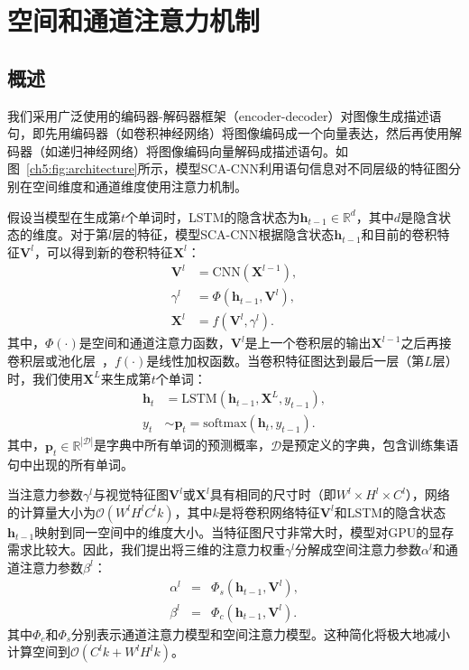 \section{空间和通道注意力机制}

\subsection{概述}
我们采用广泛使用的编码器-解码器框架（encoder-decoder）对图像生成描述语句，即先用编码器（如卷积神经网络）将图像编码成一个向量表达，然后再使用解码器（如递归神经网络）将图像编码向量解码成描述语句。如图~\ref{ch5:fig:architecture}所示，模型SCA-CNN利用语句信息对不同层级的特征图分别在空间维度和通道维度使用注意力机制。

假设当模型在生成第$t$个单词时，LSTM的隐含状态为$\bm{h}_{t-1}\in\mathbb{R}^d$，其中$d$是隐含状态的维度。对于第$l$层的特征，模型SCA-CNN根据隐含状态$\bm{h}_{t-1}$和目前的卷积特征$\bm{V}^l$，可以得到新的卷积特征$\bm{X}^l$：
\begin{equation} \label{ch5:eq:eq_1}
\begin{split}
\bm{V}^l &= \textrm{CNN}\left(\bm{X}^{l-1}\right),\\
\gamma^l &= \Phi\left(\bm{h}_{t-1},\bm{V}^l\right),\\
\bm{X}^l &= f\left(\bm{V}^{l},\gamma^{l}\right).
\end{split}
\end{equation}
其中，$\Phi(\cdot)$是空间和通道注意力函数，$\bm{V}^l$是上一个卷积层的输出$\bm{X}^{l-1}$之后再接卷积层或池化层~\cite{simonyan2015very,he2016deep}，$f(\cdot)$是线性加权函数。当卷积特征图达到最后一层（第$L$层）时，我们使用$\bm{X}^L$来生成第$t$个单词：
\begin{equation}
\begin{split}
\bm{h}_t &= \textrm{LSTM}\left(\bm{h}_{t-1},\bm{X}^L,y_{t-1}\right),\\
y_t & \sim \bm{p}_t = \textrm{softmax} \left(\bm{h}_t, y_{t-1} \right).
\end{split}
\end{equation}
其中，$\bm{p}_t \in \mathbb{R}^{|\mathcal{D}|}$是字典中所有单词的预测概率，$\mathcal{D}$是预定义的字典，包含训练集语句中出现的所有单词。

当注意力参数$\gamma^l$与视觉特征图$\bm{V}^l$或$\bm{X}^l$具有相同的尺寸时（即$W^l\times H^l\times C^l$），网络的计算量大小为$\mathcal{O}(W^lH^lC^lk)$，其中$k$是将卷积网络特征$\bm{V}^l$和LSTM的隐含状态$\bm{h}_{t-1}$映射到同一空间中的维度大小。当特征图尺寸非常大时，模型对GPU的显存需求比较大。因此，我们提出将三维的注意力权重$\gamma^l$分解成空间注意力参数$\alpha^l$和通道注意力参数$\beta^l$：
\begin{eqnarray}
\alpha^l &= & \Phi_s \left(\bm{h}_{t-1},\bm{V}^l\right),  \label{ch5:eq:eq_3} \\
\beta^l &= & \Phi_c \left(\bm{h}_{t-1},\bm{V}^l\right). \label{ch5:eq:eq_4}
\end{eqnarray}
其中$\Phi_c$和$\Phi_s$分别表示通道注意力模型和空间注意力模型。这种简化将极大地减小计算空间到$\mathcal{O}(C^lk+W^lH^lk)$。


